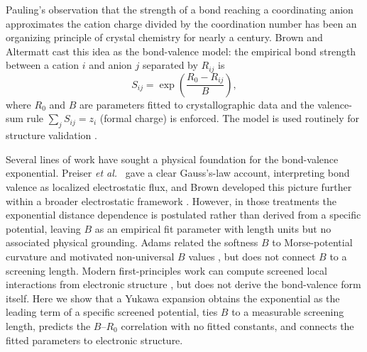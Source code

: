\documentclass[aps,prl,twocolumn,10pt,superscriptaddress,floatfix]{revtex4-2}
\begin{document}
Pauling's observation that the strength of a bond reaching a coordinating
anion approximates the cation charge divided by the coordination number
\cite{Pauling1929} has been an organizing principle of crystal chemistry
for nearly a century.  Brown and Altermatt \cite{Brown1985} cast this idea
as the bond-valence model: the empirical bond strength between a cation $i$
and anion $j$ separated by $R_{ij}$ is
\begin{equation}\label{eq:bv}
S_{ij}=\exp\!\left(\frac{R_0-R_{ij}}{B}\right),
\end{equation}
where $R_0$ and $B$ are parameters fitted to crystallographic data and the
valence-sum rule $\sum_j S_{ij}=z_i$ (formal charge) is enforced.  The
model is used routinely for structure validation
\cite{Brown2009,Brown2016,Gagn2015}.

Several lines of work have sought a physical foundation for the
bond-valence exponential.  Preiser \emph{et al.}\ \cite{Preiser1999} gave
a clear Gauss's-law account, interpreting bond valence as localized
electrostatic flux, and Brown developed this picture further within a
broader electrostatic framework \cite{Brown2009,Brown2016}. However, in those
treatments the exponential distance dependence is postulated rather than
derived from a specific potential, leaving $B$ as an empirical fit
parameter with length units but no associated physical grounding.  
Adams related the softness $B$ to Morse-potential curvature and motivated non-universal
$B$ values \cite{Adams2001,Chen2017}, but does not connect $B$ to a screening length.
Modern first-principles work can compute screened local interactions
from electronic structure \cite{Aryasetiawan2004,Shih2012}, but does not
derive the bond-valence form itself.  Here we show that a Yukawa
expansion obtains the exponential as the leading term of a specific
screened potential, ties $B$ to a measurable screening length, predicts
the $B$--$R_0$ correlation with no fitted constants, and connects the
fitted parameters to electronic structure.
\end{document}
